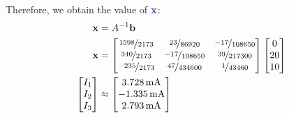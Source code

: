 Therefore, we obtain the value of $\mbluebf{x}$:
\begin{align}
    \mathbf{x}&=A^{-1}\mathbf{b} \nonumber\\
    \mathbf{x}&=
    \begin{bmatrix}
        \nicefrac{1598}{2173} & \nicefrac{23}{86920} & \nicefrac{-17}{108650} \\
        \nicefrac{340}{2173} & \nicefrac{-17}{108650} & \nicefrac{39}{217300} \\
        \nicefrac{-235}{2173} & \nicefrac{47}{434600} & \nicefrac{1}{43460}
    \end{bmatrix}
    \begin{bmatrix}
        0 \\ 20 \\ 10
    \end{bmatrix} \nonumber \\
    \begin{bmatrix}
        I_1 \\ I_2 \\ I_3
    \end{bmatrix}
    & \approx
    \begin{bmatrix}
        3.728\,\text{mA} \\ -1.335\,\text{mA} \\ 2.793\,\text{mA}
    \end{bmatrix}
\end{align}

\newpage